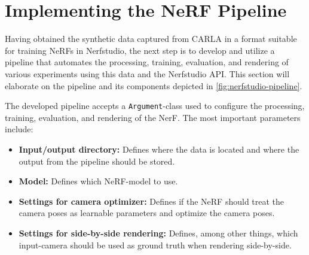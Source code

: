 \section{Implementing the NeRF Pipeline} \label{sec:nerfstudio-pipeline}
\begin{comment}
Premise: Have data in a Nerfstudio format, collected from CARLA.
Question: How can I train a NeRF that represent the same scene?

\begin{itemize}
    \item Explain the Nerfstudio API and the created pipeline. Train, eval, render
    \item Go into detail on e.g. the train/eval-split, training parameters, etc. Add additional info to the appendix.
\end{itemize}
\end{comment}





Having obtained the synthetic data captured from CARLA in a format suitable for training NeRFs in Nerfstudio, the next step is to develop and utilize a pipeline that automates the processing, training, evaluation, and rendering of various experiments using this data and the Nerfstudio API. This section will elaborate on the pipeline and its components depicted in \autoref{fig:nerfstudio-pipeline}.



The developed pipeline accepts a \texttt{Argument}-class used to configure the processing, training, evaluation, and rendering of the NerF. The most important parameters include:

\begin{itemize}
    \item \textbf{Input/output directory:} Defines where the data is located and where the output from the pipeline should be stored.
    \item \textbf{Model:} Defines which NeRF-model to use.
    \item \textbf{Settings for camera optimizer:} Defines if the NeRF should treat the camera poses as learnable parameters and optimize the camera poses.
    \item \textbf{Settings for side-by-side rendering:} Defines, among other things, which input-camera should be used as ground truth when rendering side-by-side.
\end{itemize}

